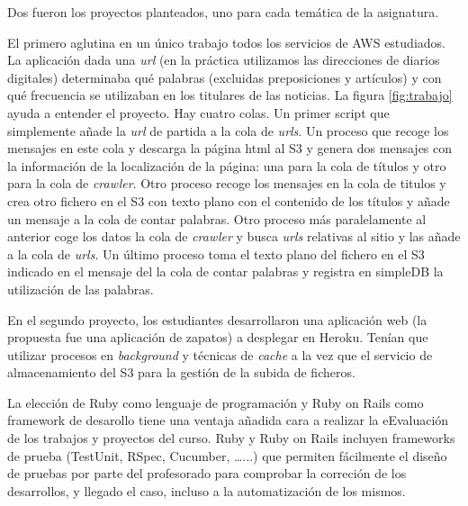 \documentclass[conference]{IEEEtran}
\begin{document}
Dos fueron los proyectos planteados, uno para cada temática de la asignatura.

El primero aglutina en un único trabajo todos los servicios de AWS estudiados. La aplicación dada una \textit{url}
(en la práctica utilizamos las direcciones de diarios digitales) determinaba qué palabras (excluidas preposiciones y artículos) y con qué frecuencia
se utilizaban en los titulares de las noticias. La figura \ref{fig:trabajo} ayuda a entender el proyecto.
Hay cuatro colas. Un primer script que simplemente añade la \textit{url} de partida a la cola de \textit{urls}.
Un proceso que recoge los mensajes en este cola y descarga la página html al S3 y genera dos mensajes con la información de la localización
de la página: una para la cola de títulos y otro para la cola  de \textit{crawler}.
Otro proceso  recoge los mensajes en la cola de titulos y crea otro fichero en el S3 con texto plano con el contenido de los títulos y añade un mensaje a la cola de contar palabras.
Otro proceso más paralelamente al anterior coge los datos la cola de \textit{crawler} y busca \textit{urls} relativas al sitio y las añade a la cola de \textit{urls}.
Un último proceso toma el texto plano del fichero en el S3 indicado en el mensaje del la cola de contar palabras y registra en simpleDB la utilización de las palabras.

En el segundo proyecto, los estudiantes desarrollaron una aplicación web (la propuesta fue una aplicación de zapatos) a desplegar en Heroku.
Tenían que utilizar procesos en \textit{background} y técnicas de \textit{cache} a la vez que el servicio de almacenamiento del S3 para la gestión de la subida de ficheros.


La elección de Ruby como lenguaje de programación y Ruby on Rails como framework de desarollo tiene una ventaja añadida cara a realizar la eEvaluación de los trabajos y proyectos del curso.
Ruby y Ruby on Rails incluyen frameworks de prueba (TestUnit, RSpec, Cucumber, \dots...) que permiten fácilmente el diseño de pruebas por parte del profesorado para comprobar la correción de los desarrollos,
y llegado el caso, incluso a la automatización de los mismos.
\end{document}
